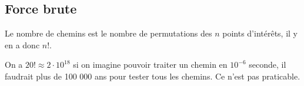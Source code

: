 \subsection{Force brute} 
\begin{Exercise}[title = {\bf II.B.1)}]
Le nombre de chemins est le nombre de permutations des $n$ points d'intérêts, il y en a donc $n!$.
\end{Exercise}
\begin{Exercise}[title = {\bf II.B.2)}]
On a $20!\approx 2\cdot10^{18}$ si on imagine pouvoir traiter un chemin en  $10^{-6}$ seconde, il faudrait plus de 100 000 ans pour tester tous les chemins.
Ce n'est pas praticable.
\end{Exercise}
